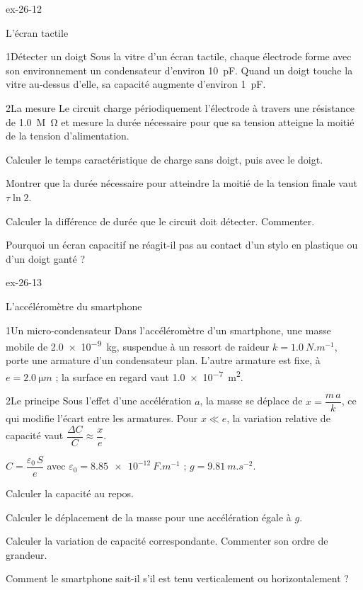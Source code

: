 \begin{blocLivre}{ex-26-12}
\begin{exercice}[3]{L'écran tactile}
\begin{docu}{1}{Détecter un doigt}
Sous la vitre d'un écran tactile, chaque électrode forme avec son environnement un condensateur d'environ \qty{10}{pF}.
Quand un doigt touche la vitre au-dessus d'elle, sa capacité augmente d'environ \qty{1}{pF}.
\end{docu}
\begin{docu}{2}{La mesure}
Le circuit charge périodiquement l'électrode à travers une résistance de \qty{1,0}{M\ohm} et mesure la durée nécessaire pour
que sa tension atteigne la moitié de la tension d'alimentation.
\end{docu}
\begin{questions}
\item Calculer le temps caractéristique de charge sans doigt, puis avec le doigt.
\item Montrer que la durée nécessaire pour atteindre la moitié de la tension finale vaut $\tau\ln2$.
\item \initiative Calculer la différence de durée que le circuit doit détecter. Commenter.
\item Pourquoi un écran capacitif ne réagit-il pas au contact d'un stylo en plastique ou d'un doigt ganté ?
\end{questions}
\end{exercice}
\end{blocLivre}
\begin{blocLivre}{ex-26-13}
\begin{exercice}[3]{L'accéléromètre du smartphone}
\begin{docu}{1}{Un micro-condensateur}
Dans l'accéléromètre d'un smartphone, une masse mobile de \qty{2,0e-9}{kg}, suspendue à un ressort de raideur
$k=\qty{1,0}{N.m^{-1}}$, porte une armature d'un condensateur plan. L'autre armature est fixe, à $e=\qty{2,0}{\micro m}$ ; la
surface en regard vaut \qty{1,0e-7}{m^2}.
\end{docu}
\begin{docu}{2}{Le principe}
Sous l'effet d'une accélération $a$, la masse se déplace de $x=\dfrac{m\,a}{k}$, ce qui modifie l'écart entre les armatures. Pour
$x\ll e$, la variation relative de capacité vaut $\dfrac{\Delta C}{C}\approx\dfrac{x}{e}$.
\end{docu}
\begin{donnees}
$C=\dfrac{\varepsilon_0\,S}{e}$ avec $\varepsilon_0=\qty{8,85e-12}{F.m^{-1}}$ ; $g=\qty{9,81}{m.s^{-2}}$.
\end{donnees}
\begin{questions}
\item Calculer la capacité au repos.
\item Calculer le déplacement de la masse pour une accélération égale à $g$.
\item \initiative Calculer la variation de capacité correspondante. Commenter son ordre de grandeur.
\item Comment le smartphone sait-il s'il est tenu verticalement ou horizontalement ?
\end{questions}
\end{exercice}
\end{blocLivre}
